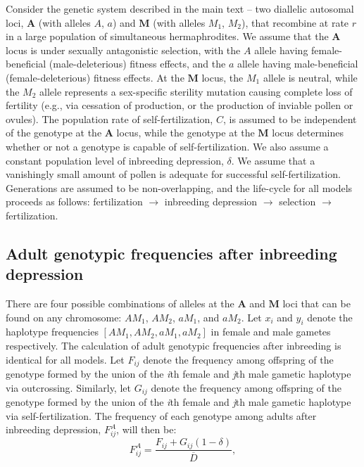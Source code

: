 \documentclass{article}
\begin{document}
Consider the genetic system described in the main text -- two diallelic autosomal loci, $\mathbf{A}$ (with alleles $A$, $a$) and $\mathbf{M}$ (with alleles $M_1$, $M_2$), that recombine at rate $r$ in a large population of simultaneous hermaphrodites. We assume that the $\mathbf{A}$ locus is under sexually antagonistic selection, with the $A$ allele having female-beneficial (male-deleterious) fitness effects, and the $a$ allele having male-beneficial (female-deleterious) fitness effects. At the $\mathbf{M}$ locus, the $M_1$ allele is neutral, while the $M_2$ allele represents a sex-specific sterility mutation causing complete loss of fertility (e.g., via cessation of production, or the production of inviable pollen or ovules). The population rate of self-fertilization, $C$, is assumed to be independent of the genotype at the $\mathbf{A}$ locus, while the genotype at the $\mathbf{M}$ locus determines whether or not a genotype is capable of self-fertilization. We also assume a constant population level of inbreeding depression, $\delta$. We assume that a vanishingly small amount of pollen is adequate for successful self-fertilization. Generations are assumed to be non-overlapping, and the life-cycle for all models proceeds as follows: fertilization $\rightarrow$ inbreeding depression $\rightarrow$ selection $\rightarrow$ fertilization.

\subsection*{Adult genotypic frequencies after inbreeding depression}

There are four possible combinations of alleles at the $\mathbf{A}$ and $\mathbf{M}$ loci that can be found on any chromosome: $A M_1$, $A M_2$, $a M_1$, and $a M_2$. Let $x_i$ and $y_i$ denote the haplotype frequencies $[AM_1,AM_2,aM_1,aM_2]$ in female and male gametes respectively. The calculation of adult genotypic frequencies after inbreeding is identical for all models. Let $F_{ij}$ denote the frequency among offspring of the genotype formed by the union of the \textit{i}th female and \textit{j}th male gametic haplotype via outcrossing. Similarly, let $G_{ij}$ denote the frequency among offspring of the genotype formed by the union of the \textit{i}th female and \textit{j}th male gametic haplotype via self-fertilization. The frequency of each genotype among adults after inbreeding depression, $F^A_{ij}$, will then be:
\begin{equation} \label{eq:AdultFreq}
	F^A_{ij} = \frac{F_{ij} + G_{ij}(1 - \delta)}{\overline{D}},
\end{equation}
\end{document}
